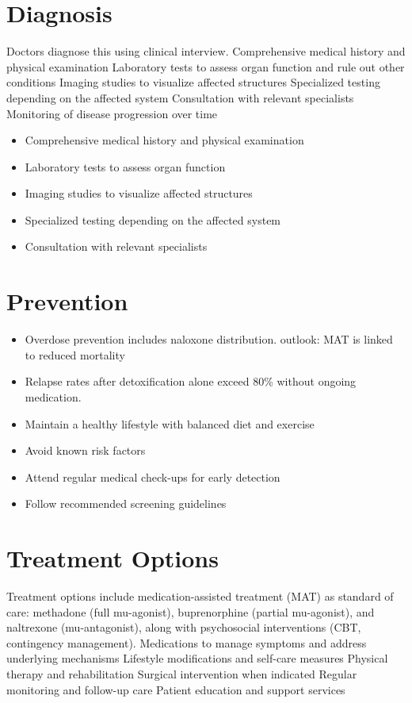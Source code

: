 \section{Diagnosis}
Doctors diagnose this using clinical interview. Comprehensive medical history and physical examination Laboratory tests to assess organ function and rule out other conditions Imaging studies to visualize affected structures Specialized testing depending on the affected system Consultation with relevant specialists Monitoring of disease progression over time

\begin{itemize}[noitemsep]
  \item Comprehensive medical history and physical examination
  \item Laboratory tests to assess organ function
  \item Imaging studies to visualize affected structures
  \item Specialized testing depending on the affected system
  \item Consultation with relevant specialists
\end{itemize}
\section{Prevention}
\begin{itemize}[noitemsep]
  \item Overdose prevention includes naloxone distribution. outlook: MAT is linked to reduced mortality
  \item Relapse rates after detoxification alone exceed 80\% without ongoing medication.
  \item Maintain a healthy lifestyle with balanced diet and exercise
  \item Avoid known risk factors
  \item Attend regular medical check-ups for early detection
  \item Follow recommended screening guidelines
\end{itemize}
\section{Treatment Options}
Treatment options include medication-assisted treatment (MAT) as standard of care: methadone (full mu-agonist), buprenorphine (partial mu-agonist), and naltrexone (mu-antagonist), along with psychosocial interventions (CBT, contingency management). Medications to manage symptoms and address underlying mechanisms Lifestyle modifications and self-care measures Physical therapy and rehabilitation Surgical intervention when indicated Regular monitoring and follow-up care Patient education and support services

